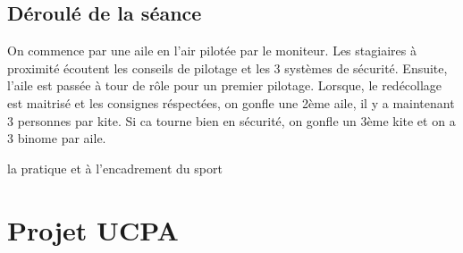 \documentclass[11pt,a4paper]{report}
\begin{document}
\section{Déroulé de la séance}
On commence par une aile en l'air pilotée par le moniteur.
Les stagiaires à proximité écoutent les conseils de pilotage et les 3 systèmes
de sécurité.
Ensuite, l'aile est passée à tour de rôle pour un premier pilotage.
Lorsque, le redécollage est maitrisé et les consignes réspectées, 
on gonfle une 2ème aile, il y a maintenant 3 personnes par kite.
Si ca tourne bien en sécurité, on gonfle un 3ème kite et on a 3 binome par aile.

la pratique et à l'encadrement du sport

\chapter{Projet UCPA\label{ucpa_projet}}



\end{document}
